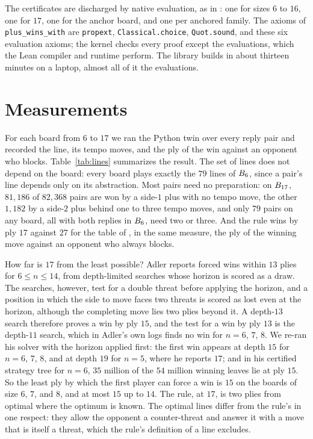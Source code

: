 \documentclass[11pt]{amsart}
\theoremstyle{definition}
\theoremstyle{remark}
\begin{document}
The certificates are discharged by native evaluation, as in
\cite{reid-threshold}: one for sizes $6$ to $16$, one for $17$, one
for the anchor board, and one per anchored family. The axioms of
\texttt{plus\_wins\_with} are \texttt{propext},
\texttt{Classical.choice}, \texttt{Quot.sound}, and these six
evaluation axioms; the kernel checks every proof except the
evaluations, which the Lean compiler and runtime perform. The library
builds in about thirteen minutes on a laptop, almost all of it the
evaluations.

\section{Measurements}\label{sec:measure}

For each board from $6$ to $17$ we ran the Python twin over every
reply pair and recorded the line, its tempo moves, and the ply of the
win against an opponent who blocks. Table~\ref{tab:lines} summarizes
the result. The set of lines does not depend
on the board: every board plays exactly the $79$ lines of $B_6$,
since a pair's line depends only on its abstraction. Most pairs need
no preparation: on $B_{17}$, $81{,}186$ of $82{,}368$ pairs are
won by a side-$1$ plus with no tempo move, the other $1{,}182$ by a
side-$2$ plus behind one to three tempo moves, and only $79$ pairs on
any board, all with both replies in $B_6$, need two or three.
And the rule wins by ply $17$ against $27$ for the table of
\cite{reid-threshold}, in the same measure, the ply of the winning
move against an opponent who always blocks.

How far is $17$ from the least possible? Adler \cite{adler} reports
forced wins within $13$ plies for $6 \le n \le 14$, from depth-limited
searches whose horizon is scored as a draw. The searches, however,
test for a double threat before applying the horizon, and a position
in which the side to move faces two threats is scored as lost even at
the horizon, although the completing move lies two plies beyond it.
A depth-$13$ search therefore proves a win by ply $15$, and the test
for a win by ply $13$ is the depth-$11$ search, which in Adler's own
logs finds no win for $n = 6$, $7$, $8$. We re-ran his solver with the
horizon applied first: the first win appears at depth $15$ for
$n = 6$, $7$, $8$, and at depth $19$ for $n = 5$, where he reports
$17$; and in his certified strategy tree for $n = 6$, $35$ million of
the $54$ million winning leaves lie at ply $15$. So the least ply by
which the first player can force a win is $15$ on the boards of size
$6$, $7$, and $8$, and at most $15$ up to $14$. The rule, at $17$, is
two plies from optimal where the optimum is known. The optimal lines
differ from the rule's in one respect: they allow the opponent a
counter-threat and answer it with a move that is itself a threat,
which the rule's definition of a line excludes.
\end{document}
